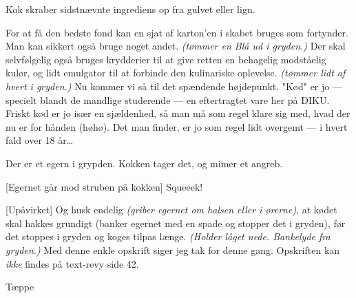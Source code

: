 \documentclass{article}
\begin{document}
\begin{sketch}
\scene Kok skraber sidstnævnte ingrediens op fra gulvet eller lign.

For at få den bedste fond kan en sjat af karton'en i skabet
bruges som fortynder. Man kan sikkert også bruge noget andet.  {\em (tømmer
  en Blå ud i gryden.)\/} Der skal selvfølgelig også bruges krydderier til
at give retten en behagelig modståelig kulør, og lidt emulgator til at
forbinde den kulinariske oplevelse. {\em (tømmer lidt af hvert i
  gryden.)\/} Nu kommer vi så til det spændende højdepunkt. "Kød" er jo ---
specielt blandt de mandlige studerende --- en eftertragtet vare her på
DIKU. Friskt kød er jo især en sjældenhed, så man må som regel klare sig
med, hvad der nu er for hånden (høhø). Det man finder, er jo som regel lidt
overgemt --- i hvert fald over 18 år\ldots

\scene Der er et egern i grypden. Kokken tager det, og mimer et angreb.

[Egernet går mod struben på kokken] Squeeek!

[Upåvirket] Og husk endelig {\em (griber egernet om halsen eller
  i ørerne)}, at kødet skal hakkes grundigt (banker egernet med en spade og
stopper det i gryden), før det stoppes i gryden og koges tilpas længe.
{\em (Holder låget nede. Bankelyde fra gryden.)} Med denne enkle opskrift
siger jeg tak for denne gang. Opskriften kan {\em ikke\/} findes på text-revy
side 42.

\scene Tæppe
\end{sketch}
\end{document}
